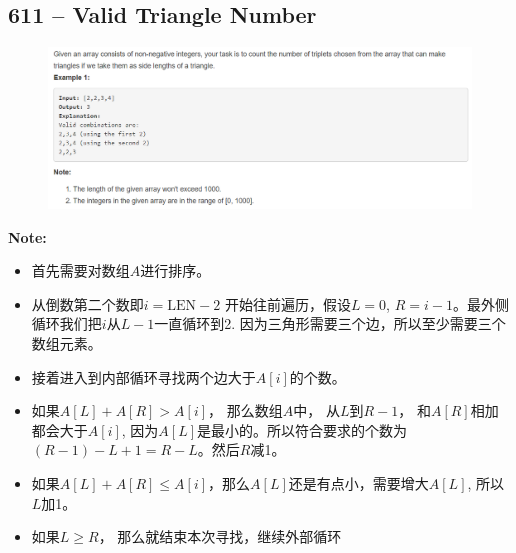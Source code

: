 \documentclass[a4paper,12pt]{article}
\begin{document}
\subsection{611 -- Valid Triangle Number}
\begin{figure}[H]
	\begin{center}
		\includegraphics[width=15cm]{611.png}
	\end{center}
\end{figure}
\textbf{\large{Note:}}
\par
\vspace{0.5em}
\noindent
\begin{CJK*}{UTF8}{gbsn}
	\begin{itemize}
		\item 首先需要对数组$A$进行排序。
		\item 从倒数第二个数即$i = \text{LEN} -2 $ 开始往前遍历，假设$L=0$, $R=i-1$。最外侧循环我们把$i$从$L-1$一直循环到2. 因为三角形需要三个边，所以至少需要三个数组元素。
		\item 接着进入到内部循环寻找两个边大于$A[i]$的个数。
		\item 如果$A[L] + A[R] > A[i]$， 那么数组$A$中， 从$L$到$R-1$， 和$A[R]$相加都会大于$A[i]$, 因为$A[L]$是最小的。所以符合要求的个数为$(R-1)-L +1 = R - L$。然后$R$减1。
		\item 如果$A[L] + A[R] \leq A[i]$，那么$A[L]$还是有点小，需要增大$A[L]$, 所以$L$加1。
		\item 如果$L \ge R$， 那么就结束本次寻找，继续外部循环
	\end{itemize}
	\clearpage
\end{CJK*}
\end{document}
